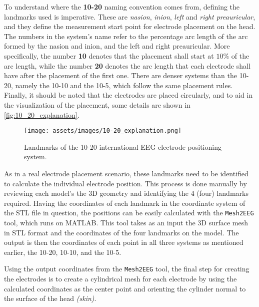 To understand where the \textbf{10-20} naming convention comes from, defining the landmarks used is imperative. These are \textit{\gls{nasion}}, \textit{\gls{inion}}, \textit{left} and \textit{right \gls{preauricular}}, and they define the measurement start point for electrode placement on the head. The numbers in the system's name refer to the percentage arc length of the arc formed by the \gls{nasion} and \gls{inion}, and the left and right \gls{preauricular}. More specifically, the number \textbf{10} denotes that the placement shall start at $10\%$ of the arc length, while the number \textbf{20} denotes the arc length that each electrode shall have after the placement of the first one. There are denser systems than the 10-20, namely the 10-10 and the 10-5, which follow the same placement rules. Finally, it should be noted that the electrodes are placed circularly, and to aid in the visualization of the placement, some details are shown in \autoref{fig:10_20_explanation}.

\begin{figure}[H]
    \centering
    \texttt{[image: assets/images/10-20\_explanation.png]}
    \caption[Landmarks of the 10-20 international \gls{EEG} electrode positioning system]{Landmarks of the 10-20 international \gls{EEG} electrode positioning system. \cite[figure 13.2, p.368]{Malmivuo1995}}
    \label{fig:10_20_explanation}
\end{figure}

As in a real electrode placement scenario, these landmarks need to be identified to calculate the individual electrode position. This process is done manually by reviewing each model's the 3D geometry and identifying the 4 (four) landmarks required. Having the coordinates of each landmark in the coordinate system of the \gls{STL} file in question, the positions can be easily calculated with the \texttt{Mesh2EEG} \cite{Giacometti2014} tool, which runs on \gls{MATLAB}. This tool takes as an input the 3D surface mesh in \gls{STL} format and the coordinates of the four landmarks on the model. The output is then the coordinates of each point in all three systems as mentioned earlier, the 10-20, 10-10, and the 10-5.

Using the output coordinates from the \texttt{Mesh2EEG} \cite{Giacometti2014} tool, the final step for creating the electrodes is to create a cylindrical mesh for each electrode by using the calculated coordinates as the center point and orienting the cylinder normal to the surface of the head \textit{(skin)}.
\\\vspace{1pt}

